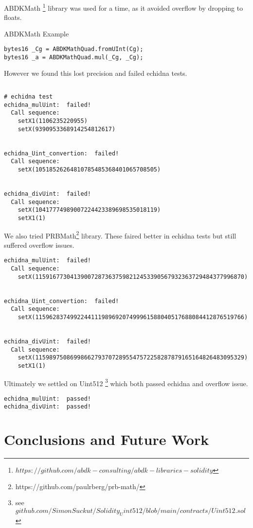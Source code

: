 \documentclass[runningheads]{llncs}
\begin{document}
ABDKMath \footnote{$https://github.com/abdk-consulting/abdk-libraries-solidity$} library was used for a time, as it avoided overflow by dropping to floats.

ABDKMath Example
\begin{verbatim}
bytes16 _Cg = ABDKMathQuad.fromUInt(Cg);
bytes16 _a = ABDKMathQuad.mul(_Cg, _Cg);
\end{verbatim}

However we found this lost precision and failed echidna tests.
\label{Uint256 overflow:5}
\begin{lstlisting}

# echidna test
echidna_mulUint:  failed!
  Call sequence:
    setX1(1106235220955)
    setX(9390953368914254812617)


echidna_Uint_convertion:  failed!
  Call sequence:
    setX(10518526264810785485368401065708505)


echidna_divUint:  failed!
  Call sequence:
    setX(10417774989007224423389698535018119)
    setX1(1)
\end{lstlisting}


We also tried PRBMath\footnote{https://github.com/paulrberg/prb-math/} library. These faired better in echidna tests but still suffered overflow issues.

\begin{lstlisting}
echidna_mulUint:  failed!
  Call sequence:
    setX(115916773041390072873637598212453390567932363729484377996870)


echidna_Uint_convertion:  failed!
  Call sequence:
    setX(115962837499224411198969207499961588040517688084412876519766)


echidna_divUint:  failed!
  Call sequence:
    setX(115989750869986627937072895547572258287879165164826483095329)
    setX1(1)
\end{lstlisting}


Ultimately we settled on Uint512 \footnote{see $github.com/SimonSuckut/Solidity_Uint512/blob/main/contracts/Uint512.sol$} which both passed echidna and overflow issue.
\begin{lstlisting}
echidna_mulUint:  passed! 
echidna_divUint:  passed!
\end{lstlisting}



\chapter{Conclusions and Future Work}
\end{document}
